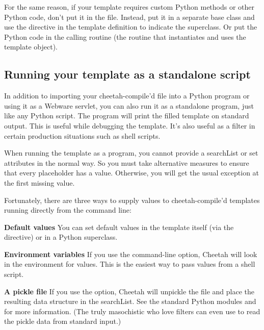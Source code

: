 For the same reason, if your template requires custom Python methods or
other Python code, don't put it in the  file.  Instead, put
it in a separate base class and use the  directive in the
template definition to indicate the superclass.  Or put the Python code
in the calling routine (the routine that instantiates and uses the template
object).

\subsection{Running your template as a standalone script}
\label{howWorks.standalone}

In addition to importing your cheetah-compile'd  file into a Python
program or using it as a Webware servlet, you can also run it as a standalone
program, just like any Python script.  The program will print the filled
template on standard output.  This is useful while debugging the template.
It's also useful as a filter in certain production situations such as shell
scripts.  

When running the template as a program, you cannot provide a searchList or
set  attributes in the normal way.  So you must take
alternative measures to ensure that every placeholder has a value.
Otherwise, you will get the usual  exception at
the first missing value.

Fortunately, there are three ways to supply values to cheetah-compile'd
templates running directly from the command line:

\begin{description}
\item{{\bf Default values}}  You can set default values in the template itself
     (via the  directive) or in a Python superclass.
\item{{\bf Environment variables}} If you use the  command-line option,
     Cheetah will look in the environment for values.  This is the easiest way
     to pass values from a shell script.
\item{{\bf A pickle file}}  If you use the  option, 
     Cheetah will unpickle the file and place the resulting data structure in
     the searchList.    See the standard Python modules  and
      for more information.  (The truly masochistic who love
     filters can even use  to read the pickle data from standard
     input.)
\end{description}

